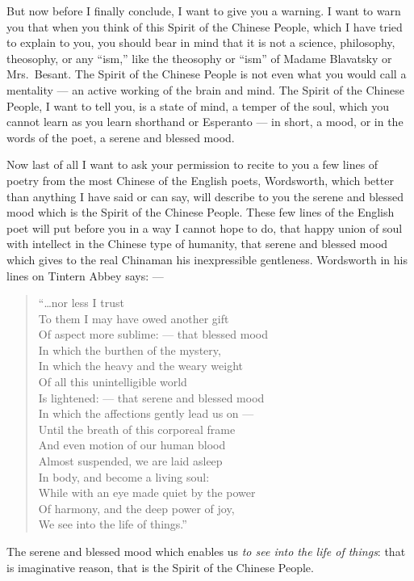 But now before I finally conclude, I want to give you a warning.
I want to warn you that when you think of this Spirit of the Chinese People, which I have tried to explain to you, you should bear in mind that it is not a science, philosophy, theosophy, or any ``ism,'' like the theosophy or ``ism'' of Madame Blavatsky or Mrs.~Besant.
The Spirit of the Chinese People is not even what you would call a mentality --- an active working of the brain and mind.
The Spirit of the Chinese People, I want to tell you, is a state of mind, a temper of the soul, which you cannot learn as you learn shorthand or Esperanto --- in short, a mood, or in the words of the poet, a serene and blessed mood.

Now last of all I want to ask your permission to recite to you a few lines of poetry from the most Chinese of the English poets, Wordsworth, which better than anything I have said or can say, will describe to you the serene and blessed mood which is the Spirit of the Chinese People.
These few lines of the English poet will put before you in a way I cannot hope to do, that happy union of soul with intellect in the Chinese type of humanity, that serene and blessed mood which gives to the real Chinaman his inexpressible gentleness.
Wordsworth in his lines on Tintern Abbey says: ---
\begin{quote}\footnotesize
   ``\dots nor less I trust \\
   To them I may have owed another gift \\
   Of aspect more sublime: --- that blessed mood \\
   In which the burthen of the mystery, \\
   In which the heavy and the weary weight \\
   Of all this unintelligible world \\
   Is lightened: --- that serene and blessed mood \\
   In which the affections gently lead us on --- \\
   Until the breath of this corporeal frame \\
   And even motion of our human blood \\
   Almost suspended, we are laid asleep \\
   In body, and become a living soul: \\
   While with an eye made quiet by the power \\
   Of harmony, and the deep power of joy, \\
   We see into the life of things.''
   \end{quote}

   The serene and blessed mood which enables us \emph{to see into the life of things}: that is imaginative reason, that is the Spirit of the Chinese People.
